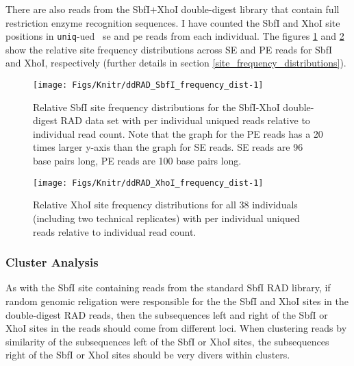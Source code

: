\documentclass[a4paper,12pt,times,authoryear,twoside,print,index]{Classes/PhDThesisPSnPDF}\usepackage[]{graphicx}\usepackage[]{color}
\newenvironment{knitrout}{}{} %
\begin{document}
There are also reads from the SbfI$+$XhoI double-digest library that contain full restriction enzyme recognition sequences. I have counted the SbfI and XhoI site positions in \texttt{uniq}-ued  ~\gls{se} and \gls{pe} reads from each individual. The figures \ref{ddRAD_SbfI_frequency_dist} and \ref{ddRAD_XhoI_frequency_dist} show the relative site frequency distributions across SE and PE reads for SbfI and XhoI, respectively (further details in section \ref{site_frequency_distributions}). 
%
\begin{figure}
\begin{knitrout}
\color{fgcolor}

{\centering \texttt{[image: Figs/Knitr/ddRAD\_SbfI\_frequency\_dist-1]} 

}



\end{knitrout}
\caption{Relative SbfI site frequency distributions for the SbfI-XhoI double-digest RAD data set with per individual uniqued reads relative to individual read count. Note that the graph for the PE reads has a 20 times larger y-axis than the graph for SE reads. SE reads are 96 base pairs long, PE reads are 100 base pairs long.}
\label{ddRAD_SbfI_frequency_dist}
\end{figure}
%
%
\begin{figure}
\begin{knitrout}
\color{fgcolor}

{\centering \texttt{[image: Figs/Knitr/ddRAD\_XhoI\_frequency\_dist-1]} 

}



\end{knitrout}
\caption{Relative XhoI site frequency distributions for all 38 individuals (including two technical replicates) with per individual uniqued reads relative to individual read count.}
\label{ddRAD_XhoI_frequency_dist}
\end{figure}
%

\subsubsection{Cluster Analysis}

As with the SbfI site containing reads from the standard SbfI RAD library, if random genomic religation were responsible for the the SbfI and XhoI sites in the double-digest RAD reads, then the subsequences left and right of the SbfI or XhoI sites in the reads should come from different loci. When clustering reads by similarity of the subsequences left of the SbfI or XhoI sites, the subsequences right of the SbfI or XhoI sites should be very divers within clusters.
\end{document}
